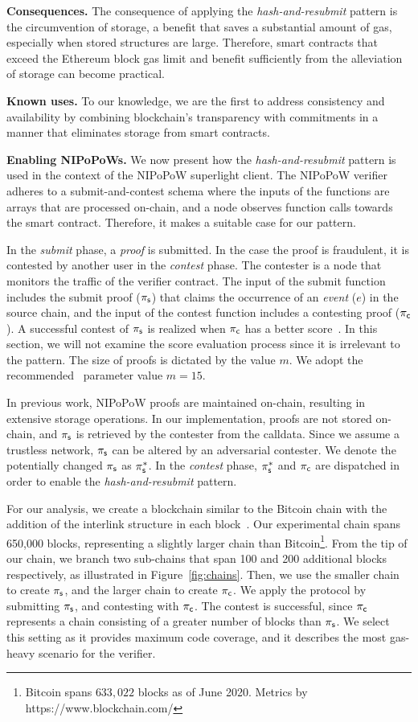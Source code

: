 \noindent \textbf{Consequences.} The consequence of applying the
\emph{hash-and-resubmit} pattern is the circumvention of storage,
a benefit that saves a substantial amount of gas, especially when
stored structures are large. Therefore, smart contracts that exceed the
Ethereum block gas limit and benefit sufficiently from the alleviation of
storage can become practical.

\noindent \textbf{Known uses.} To our knowledge, we are the first to address
consistency and availability by combining blockchain's transparency with commitments
in a manner that eliminates storage from smart contracts.

\noindent \textbf{Enabling NIPoPoWs.} We now present how the
\emph{hash-and-resubmit} pattern is used in the context of the NIPoPoW
superlight client. The NIPoPoW verifier adheres to a submit-and-contest schema
where the inputs of the functions are arrays that are processed on-chain, and a
node observes function calls towards the smart contract.  Therefore, it
makes a suitable case for our pattern.

In the \emph{submit} phase, a \emph{proof} is submitted. In the case the proof is fraudulent, it
is contested by another user in the \emph{contest} phase. The contester is a node
that monitors the traffic of the verifier contract. The input of the \textsf{submit}
function includes the submit proof ($\mathsf{\pi_{s}}$) that claims the occurrence of an
\emph{event} ($e$) in the source chain, and the input of the \textsf{contest}
function includes a contesting proof ($\mathsf{\pi_{c}}$). A successful contest of $\mathsf{\pi_{s}}$
is realized when $\mathsf{\pi_{c}}$ has a better score~\cite{nipopows}. In this section, we
will not examine the score evaluation process since it is irrelevant to the
pattern. The size of proofs is dictated by the value $m$. We adopt the recommended~\cite{nipopows}
parameter value $m = 15$.

In previous work, NIPoPoW proofs are maintained on-chain, resulting in
extensive storage operations. In our implementation, proofs are not stored on-chain, and $\mathsf{\pi_{s}}$
is retrieved by the contester from the calldata. Since we
assume a trustless network, $\mathsf{\pi_{s}}$ can be altered by an adversarial contester. We denote
the potentially changed $\mathsf{\pi_{s}}$ as $\mathsf{\pi_{s}^*}$. In the \emph{contest} phase, $\mathsf{\pi_{s}^*}$ and
$\mathsf{\pi_{c}}$ are dispatched in order to enable the \emph{hash-and-resubmit} pattern.

For our analysis, we create a blockchain similar to the Bitcoin chain with the
addition of the interlink structure in each block~\cite{gglou}. Our experimental chain
spans 650,000 blocks, representing a slightly larger chain than
Bitcoin\footnote{Bitcoin spans $633{,}022$ blocks as of June 2020. Metrics by
https://www.blockchain.com/}. From the tip of our chain, we branch two
sub-chains that span 100 and 200 additional blocks respectively, as illustrated
in Figure~\ref{fig:chains}. Then, we use the smaller chain to create $\mathsf{\pi_{s}}$,
and the larger chain to create $\mathsf{\pi_{c}}$. We apply the protocol by submitting
$\mathsf{\pi_{s}}$, and contesting with $\mathsf{\pi_{c}}$. The contest is successful, since $\mathsf{\pi_{c}}$
represents a chain consisting of a greater number of blocks than $\mathsf{\pi_{s}}$.
We select this setting as it
provides maximum code coverage, and it describes the most gas-heavy scenario
for the verifier.

